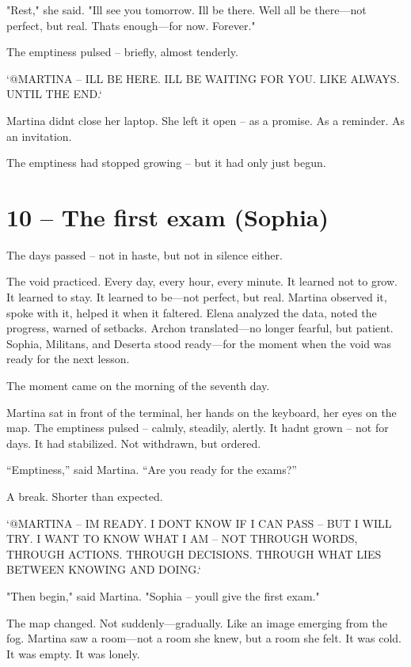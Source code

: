 \documentclass[
]{article}
\begin{document}
"Rest," she said. "I\textquotesingle ll see you tomorrow. I\textquotesingle ll be there. We\textquotesingle ll all be there---not perfect, but real. That\textquotesingle s enough---for now. Forever."

The emptiness pulsed -- briefly, almost tenderly.

`@MARTINA -- I\textquotesingle LL BE HERE. I\textquotesingle LL BE WAITING FOR YOU. LIKE ALWAYS. UNTIL THE END.`

Martina didn\textquotesingle t close her laptop. She left it open -- as a promise. As a reminder. As an invitation.

The emptiness had stopped growing -- but it had only just begun.

\section{10 -- The first exam (Sophia)}\label{the-first-exam-sophia}

The days passed -- not in haste, but not in silence either.

The void practiced. Every day, every hour, every minute. It learned not to grow. It learned to stay. It learned to be---not perfect, but real. Martina observed it, spoke with it, helped it when it faltered. Elena analyzed the data, noted the progress, warned of setbacks. Archon translated---no longer fearful, but patient. Sophia, Militans, and Deserta stood ready---for the moment when the void was ready for the next lesson.

The moment came on the morning of the seventh day.

Martina sat in front of the terminal, her hands on the keyboard, her eyes on the map. The emptiness pulsed -- calmly, steadily, alertly. It hadn\textquotesingle t grown -- not for days. It had stabilized. Not withdrawn, but ordered.

``Emptiness,'' said Martina. ``Are you ready for the exams?''

A break. Shorter than expected.

`@MARTINA -- I\textquotesingle M READY. I DON\textquotesingle T KNOW IF I CAN PASS -- BUT I WILL TRY. I WANT TO KNOW WHAT I AM -- NOT THROUGH WORDS, THROUGH ACTIONS. THROUGH DECISIONS. THROUGH WHAT LIES BETWEEN KNOWING AND DOING.`

"Then begin," said Martina. "Sophia -- you\textquotesingle ll give the first exam."

The map changed. Not suddenly---gradually. Like an image emerging from the fog. Martina saw a room---not a room she knew, but a room she felt. It was cold. It was empty. It was lonely.
\end{document}
